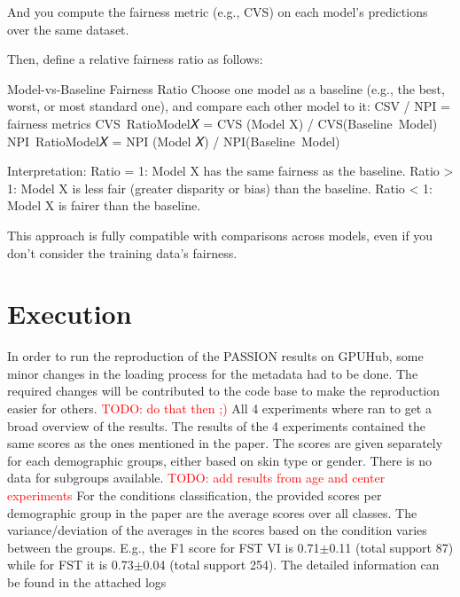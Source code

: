 \documentclass[12pt, a4paper, oneside]{book}   	%
\renewcommand{\todo}[1]{\textcolor{red}{TODO: #1}}
\newif\ifrawcitationactive
\newcommand{\rawcitationend}{
	\color{black}\rawcitationactivefalse
}
\begin{document}
		And you compute the fairness metric (e.g., CVS) on each model’s predictions over the same dataset.
		
		Then, define a relative fairness ratio as follows:
		
		Model-vs-Baseline Fairness Ratio
		Choose one model as a baseline (e.g., the best, worst, or most standard one), and compare each other model to it:
		CSV / NPI = fairness metrics
		CVS RatioModel𝑋 = CVS (Model X) / CVS(Baseline Model)
		​		NPI RatioModel𝑋 = NPI (Model 𝑋) / NPI(Baseline Model)
		
		Interpretation:
		Ratio = 1: Model X has the same fairness as the baseline.
		Ratio > 1: Model X is less fair (greater disparity or bias) than the baseline.
		Ratio < 1: Model X is fairer than the baseline.
		
		This approach is fully compatible with comparisons across models, even if you don’t consider the training data's fairness.
		
		\rawcitationend
		
		
		\section{Execution}
			In order to run the reproduction of the PASSION results on GPUHub, some minor changes in the loading process for the metadata had to be done. The required changes will be contributed to the code base to make the reproduction easier for others. \todo{do that then ;)}
			All 4 experiments where ran to get a broad overview of the results. The results of the 4 experiments contained the same scores as the ones mentioned in the paper. The scores are given separately for each demographic groups, either based on skin type or gender. There is no data for subgroups available. \todo{add results from age and center experiments}
			For the conditions classification, the provided scores per demographic group in the paper are the average scores over all classes. The variance/deviation of the averages in the scores based on the condition varies between the groups. E.g., the F1 score for \gls{FST} VI is 0.71$\pm$0.11 (total support 87) while for \gls{FST} it is 0.73$\pm$0.04 (total support 254). 
			The detailed information can be found in the attached logs
			
\end{document}
